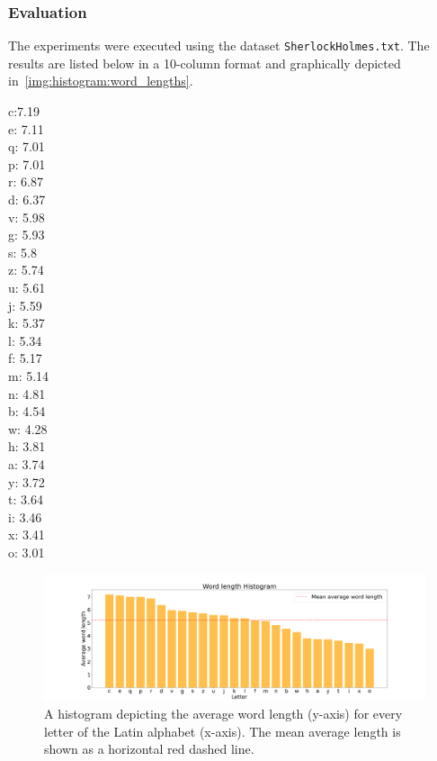 \documentclass[acmlarge]{acmart}
\begin{document}
\subsubsection{Evaluation}
The experiments were executed using the dataset \texttt{SherlockHolmes.txt}. The results are listed below in a 10-column format and graphically depicted in~\autoref{img:histogram:word_lengths}.
\begin{multicols}{10}
  \noindent
  c:7.19
  \\ e: 7.11
  \\ q: 7.01
  \\ p: 7.01
  \\ r: 6.87
  \\ d: 6.37
  \\ v: 5.98
  \\ g: 5.93
  \\ s: 5.8
  \\ z: 5.74
  \\ u: 5.61
  \\ j: 5.59
  \\ k: 5.37
  \\ l: 5.34
  \\ f: 5.17
  \\ m: 5.14
  \\ n: 4.81
  \\ b: 4.54
  \\ w: 4.28
  \\ h: 3.81
  \\ a: 3.74
  \\ y: 3.72
  \\ t: 3.64
  \\ i: 3.46
  \\ x: 3.41
  \\ o: 3.01
  \label{multicol:test}
\end{multicols}

\begin{figure}[tb!]
  \centering
  \includegraphics[width=\linewidth]{figures/download}
  \caption{A histogram depicting the average word length (y-axis) for every letter of the Latin alphabet (x-axis). The mean average length is shown as a horizontal red dashed line.}
  \label{img:histogram:word_lengths}
\end{figure}
\end{document}
